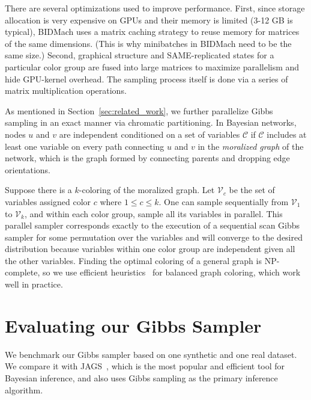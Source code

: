 \documentclass{article} %
\begin{document}
There are several optimizations used to improve performance.  First, since storage allocation is
very expensive on GPUs and their memory is limited (3-12 GB is typical), BIDMach uses a matrix
caching strategy to reuse memory for matrices of the same dimensions. (This is why minibatches in
BIDMach need to be the same size.) Second, graphical structure and SAME-replicated states for a
particular color group are fused into large matrices to maximize parallelism and hide GPU-kernel
overhead. The sampling process itself is done via a series of matrix multiplication operations.

As mentioned in Section~\ref{sec:related_work}, we further parallelize Gibbs sampling in an
exact manner via chromatic partitioning. In Bayesian networks, nodes $u$ and $v$ are independent
conditioned on a set of variables $\mathcal{C}$ if $\mathcal{C}$ includes at least one variable on
every path connecting $u$ and $v$ in the \emph{moralized graph} of the network, which is the graph
formed by connecting parents and dropping edge orientations.

Suppose there is a $k$-coloring of the moralized graph. Let $\mathcal{V}_c$ be the set of variables
assigned color $c$ where $1 \leq c \leq k$. One can sample sequentially from $\mathcal{V}_1$ to
$\mathcal{V}_k$, and within each color group, sample all its variables in parallel. This parallel
sampler corresponds exactly to the execution of a sequential scan Gibbs sampler for some permutation
over the variables and will converge to the desired distribution because variables within one color
group are independent given all the other variables. Finding the optimal coloring of a general graph
is NP-complete, so we use efficient heuristics~\citep{kubale2004graph} for balanced graph coloring,
which work well in practice.




\section{Evaluating our Gibbs Sampler}\label{sec:experiments}

We benchmark our Gibbs sampler based on one synthetic and one real dataset. We compare it with
JAGS~\citep{JAGS2003}, which is the most popular and efficient tool for Bayesian inference, and also
uses Gibbs sampling as the primary inference algorithm. 

\end{document}
